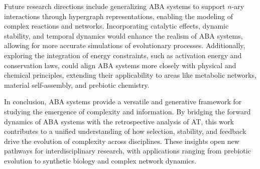 \documentclass[entropy,article,submit,pdftex,oneauthor]{Definitions/mdpi}
\begin{document}
Future research directions include generalizing ABA systems to support \( n \)-ary interactions through hypergraph representations, enabling the modeling of complex reactions and networks. Incorporating catalytic effects, dynamic stability, and temporal dynamics would enhance the realism of ABA systems, allowing for more accurate simulations of evolutionary processes. Additionally, exploring the integration of energy constraints, such as activation energy and conservation laws, could align ABA systems more closely with physical and chemical principles, extending their applicability to areas like metabolic networks, material self-assembly, and prebiotic chemistry.

In conclusion, ABA systems provide a versatile and generative framework for studying the emergence of complexity and information. By bridging the forward dynamics of ABA systems with the retrospective analysis of AT, this work contributes to a unified understanding of how selection, stability, and feedback drive the evolution of complexity across disciplines. These insights open new pathways for interdisciplinary research, with applications ranging from prebiotic evolution to synthetic biology and complex network dynamics.
\end{document}

